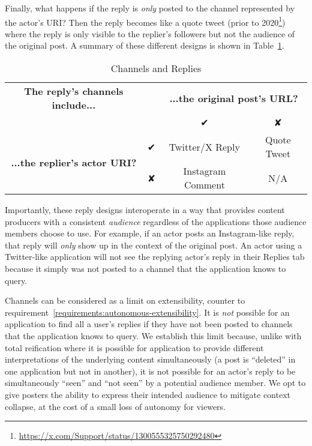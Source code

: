 Finally, what happens if the reply is \emph{only} posted to the
channel represented by the actor's URI?
Then the reply becomes like a quote tweet
(prior to 2020\footnote{
    \url{https://x.com/Support/status/1300555325750292480}
})
where the reply is only visible to the replier's followers but
not the audience of the original post.
A summary of these different designs is shown in Table~\ref{concepts:channel-replies}.

\begin{table}[htbp]
    \label{concepts:channel-replies}
    \caption{Channels and Replies}
    \begin{tabular}{c|c|c|c}
        \textbf{The reply's channels include...} & & \multicolumn{2}{c}{\textbf{...the original post's URL?}} \\
        & & ✔︎ & ✘ \\
        \multirow{2}{*}{\textbf{...the replier's actor URI?}} & ✔︎ & Twitter/X Reply & Quote Tweet \\
        & ✘ & Instagram Comment & N/A \\
    \end{tabular}
\end{table}

Importantly, these reply designs interoperate in a way that provides content producers with
a consistent \emph{audience} regardless of the applications those audience members choose to use.
For example, if an actor posts an Instagram-like reply, that reply will \emph{only} show up
in the context of the original post. An actor using a Twitter-like application
will not see the replying actor's reply in their Replies tab because it simply was not
posted to a channel that the application knows to query.

Channels can be considered as a limit on extensibility, counter to requirement~\ref{requirements:autonomous-extensibility}.
It is \emph{not} possible for an
application to find all a user's replies if they have not been posted to channels that
the application knows to query.
We establish this limit because, unlike with total reification where it is
possible for application to provide different interpretations of the underlying
content simultaneously (a post is ``deleted'' in one application but not in another),
it is not possible for an actor's reply to be simultaneously ``seen'' and ``not seen''
by a potential audience member.
We opt to give posters the ability to express their intended audience
to mitigate context collapse, at the cost of a small loss of autonomy for viewers.


